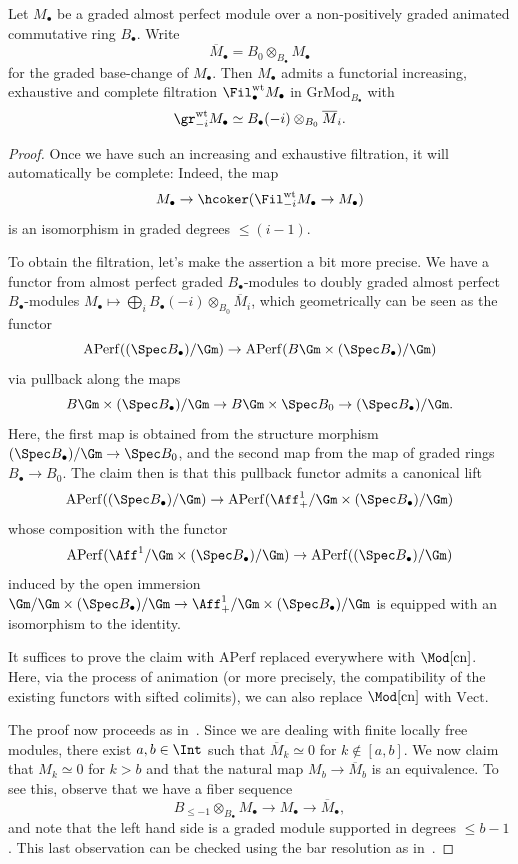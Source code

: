 \documentclass[10pt]{amsart}
\begin{document}
\begin{lemma}
\label{lem:graded_weight_filtration}
Let $M_\bullet$ be a graded almost perfect module over a non-positively graded animated commutative ring $B_\bullet$. Write 
\[
\overline{M}_\bullet = B_0\otimes_{B_\bullet}M_\bullet
\]
for the graded base-change of $M_\bullet$. Then $M_\bullet$ admits a functorial increasing, exhaustive and complete filtration $\Fil_\bullet^{\mathrm{wt}}M_\bullet$ in $\mathrm{GrMod}_{B_\bullet}$ with
\[
\gr_{-i}^{\mathrm{wt}}M_\bullet \simeq B_\bullet(-i)\otimes_{B_0}\overline{M}_i.
\]
\end{lemma}
\begin{proof}
Once we have such an increasing and exhaustive filtration, it will automatically be complete: Indeed, the map
\[
M_\bullet \to \hcoker(\Fil^{\mathrm{wt}}_{-i}M_\bullet \to M_\bullet)
\]
is an isomorphism in graded degrees $\le (i-1)$.

To obtain the filtration, let's make the assertion a bit more precise. We have a functor from almost perfect graded $B_\bullet$-modules to doubly graded almost perfect $B_\bullet$-modules $M_\bullet \mapsto \bigoplus_i B_\bullet(-i)\otimes_{B_0}\overline{M}_i$, which geometrically can be seen as the functor
\[
\mathrm{APerf}((\Spec B_\bullet)/\Gm)\to \mathrm{APerf}(B\Gm\times (\Spec B_\bullet)/\Gm)
\]
via pullback along the maps
\[
B\Gm\times (\Spec B_\bullet)/\Gm\to B\Gm\times \Spec B_0\to (\Spec B_\bullet)/\Gm.
\]
Here, the first map is obtained from the structure morphism $(\Spec B_\bullet)/\Gm \to \Spec B_0$, and the second map from the map of graded rings $B_\bullet \to B_0$. The claim then is that this pullback functor admits a canonical lift
\[
\mathrm{APerf}((\Spec B_\bullet)/\Gm)\to \mathrm{APerf}(\Aff^1_+/\Gm\times (\Spec B_\bullet)/\Gm)
\]
whose composition with the functor
\[
\mathrm{APerf}(\Aff^1/\Gm\times (\Spec B_\bullet)/\Gm)\to \mathrm{APerf}((\Spec B_\bullet)/\Gm)
\]
induced by the open immersion $\Gm/\Gm\times (\Spec B_\bullet)/\Gm\to \Aff^1_+/\Gm\times (\Spec B_\bullet)/\Gm$ is equipped with an isomorphism to the identity.

It suffices to prove the claim with $\mathrm{APerf}$ replaced everywhere with $\Mod[\mathrm{cn}]{}$. Here, via the process of animation (or more precisely, the compatibility of the existing functors with sifted colimits), we can also replace $\Mod[\mathrm{cn}]{}$ with $\mathrm{Vect}$.

The proof now proceeds as in~\cite[Theorem 2.44]{guo2023frobenius}. Since we are dealing with finite locally free modules, there exist $a,b\in \Int$ such that $\overline{M}_k \simeq 0$ for $k\notin [a,b]$. We now claim that $M_k\simeq 0$ for $k>b$ and that the natural map $M_b \to \overline{M}_b$ is an equivalence. To see this, observe that we have a fiber sequence
\[
B_{\leq -1}\otimes_{B_\bullet}M_\bullet \to M_\bullet \to \overline{M}_{\bullet},
\]
and note that the left hand side is a graded module supported in degrees $\leq b-1$. This last observation can be checked using the bar resolution as in~\cite[Lemma 2.45]{guo2023frobenius}. 


\end{proof}
\end{document}
